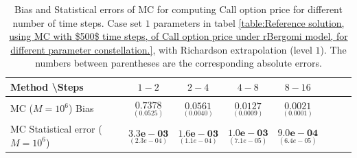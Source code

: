 \documentclass[11pt]{article}
\begin{document}
\begin{table}[h!]
	\centering
	\begin{tabular}{l*{6}{c}r}
		Method \textbackslash  Steps            & $1-2$ & $2-4$ & $4-8$ & $8-16$  \\
		\hline
		MC ($M=10^6$)  Bias   &$\underset{( 0.0525)}{\mathbf{0.7378}}$  & $\underset{(    0.0040)}{\mathbf{0.0561}}$  & $\underset{(0.0009 )}{\mathbf{0.0127}}$  & $\underset{(0.0001)}{\mathbf{0.0021}}$ \\	
		
		MC Statistical error ($M=10^6$)   & $\underset{( 2.3e-04)}{\mathbf{3.3e-03}}$  & $\underset{(  1.1e-04)}{\mathbf{1.6e-03}}$  & $\underset{(7.1e-05)}{\mathbf{1.0e-03}}$ & $\underset{(   6.4e-05 )}{\mathbf{9.0e-04}}$ \\	
		
%		
		\hline
	\end{tabular}
	\caption{Bias and Statistical errors of MC   for computing Call option price  for different number of time steps. Case set $1$ parameters in tabel \ref{table:Reference solution, using MC with $500$ time steps, of Call option price under rBergomi model, for different parameter constellation.}, with Richardson extrapolation (level $1$). The numbers between parentheses are the corresponding absolute errors.}
	\label{Bias and Statistical errors of MC ($M=10^6$)  for computing Call option price  for different number of time steps. Case set $1$ parameters, with Richardson extrapolation (level1). The numbers between parentheses are the corresponding absolute errors.}
\end{table}
\end{document}
